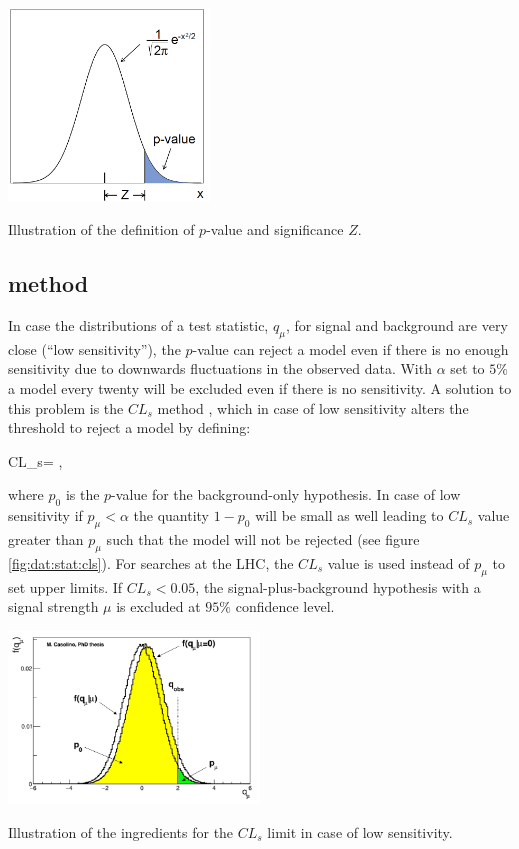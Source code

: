 \bfig[htb!]
\centering
\includegraphics[width=0.4\textwidth]{figures/Datasamples/pvalue.png}
\captionsetup{width=0.85\textwidth} \caption{\small Illustration of the definition of $p$-value and significance $Z$.}
\label{fig:dat:stat:pvalue}
\efig

\subsection[$CL_{s}$ procedure]{ method}

In case the distributions of a test statistic, $q_{\mu}$, for signal and background are very close (``low sensitivity''), the $p$-value can reject a model even if there is no enough sensitivity due to downwards fluctuations in the observed data. With $\alpha$ set to $5\%$ a model every twenty will be excluded even if there is no sensitivity. A solution to this problem is the $CL_{s}$ method \cite{Junk:1999kv}, which in case of low sensitivity alters the threshold to reject a model by defining:

\be
CL_{s}= ,
\ee 

\noindent where $p_{0}$ is the $p$-value for the background-only hypothesis. In case of low sensitivity if $p_{\mu}<\alpha$ the quantity $1-p_{0}$ will be small as well leading to $CL_{s}$ value greater than $p_{\mu}$ such that the model will not be rejected (see figure \ref{fig:dat:stat:cls}). For searches at the LHC, the $CL_{s}$ value is used instead of $p_{\mu}$ to set upper limits. If $CL_{s} < 0.05$, the signal-plus-background hypothesis with a signal strength $\mu$ is excluded at $95\%$ confidence level.

\bfig[htb!]
\centering
\includegraphics[width=0.5\textwidth]{figures/Datasamples/lowsensitivity.png}
\captionsetup{width=0.85\textwidth} \caption{\small Illustration of the ingredients for the $CL_{s}$ limit in case of low sensitivity.}
\label{fig:dat:stat:cls}
\efig


